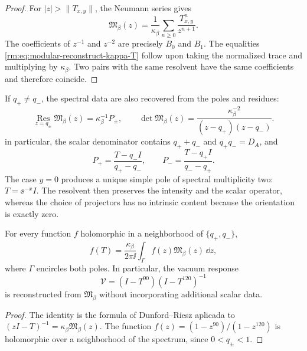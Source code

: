 \begin{proof}
For \(|z|>\lVert T_{x,y}\rVert\), the Neumann series gives
\begin{equation}
 \mathfrak M_\beta(z)
 =\frac1{\kappa_\beta}
 \sum_{n\geq0}\frac{T_{x,y}^{n}}{z^{n+1}}.
 \label{rm:eq:modular-Laurent}
\end{equation}
The coefficients of \(z^{-1}\) and \(z^{-2}\) are precisely \(B_0\) and
\(B_1\). The equalities \cref{rm:eq:modular-reconstruct-kappa-T} follow upon
taking the normalized trace and multiplying by \(\kappa_\beta\). Two pairs with
the same resolvent have the same coefficients and therefore coincide.
\end{proof}

If \(q_+\ne q_-\), the spectral data are also recovered from the poles
and residues:
\begin{equation}
 \operatorname*{Res}_{z=q_\pm}\mathfrak M_\beta(z)
 =\kappa_\beta^{-1}P_\pm,
 \qquad
 \det\mathfrak M_\beta(z)
 =\frac{\kappa_\beta^{-2}}
 {(z-q_+)(z-q_-)}.
 \label{rm:eq:modular-resolvent-residues}
\end{equation}
in particular, the scalar denominator contains
\(q_++q_-\) and \(q_+q_-=D_A\), and
\begin{equation}
 P_+=\frac{T-q_-I}{q_+-q_-},
 \qquad
 P_-=\frac{T-q_+I}{q_--q_+}.
 \label{rm:eq:modular-projector-recovery}
\end{equation}
The case \(y=0\) produces a unique simple pole of spectral multiplicity
two: \(T=\ee^{-x}I\). The resolvent then preserves the intensity and the
scalar operator, whereas the choice of projectors has no intrinsic
content because the orientation is exactly zero.

\begin{corollary}
\label{rm:cor:modular-functional-calculus}
For every function \(f\) holomorphic in a neighborhood of
\(\{q_+,q_-\}\),
\begin{equation}
 f(T)=\frac{\kappa_\beta}{2\pi\ii}
 \int_\Gamma f(z)\mathfrak M_\beta(z)\,\dd z,
 \label{rm:eq:modular-Dunford}
\end{equation}
where \(\Gamma\) encircles both poles. In particular, the vacuum response
\[
 \mathcal V=(I-T^{90})(I-T^{120})^{-1}
\]
is reconstructed from \(\mathfrak M_\beta\) without incorporating additional
scalar data.
\end{corollary}

\begin{proof}
The identity is the formula of Dunford--Riesz aplicada to
\((zI-T)^{-1}=\kappa_\beta\mathfrak M_\beta(z)\). The function
\(f(z)=(1-z^{90})/(1-z^{120})\) is holomorphic over a neighborhood of the spectrum,
since \(0<q_\pm<1\).
\end{proof}

